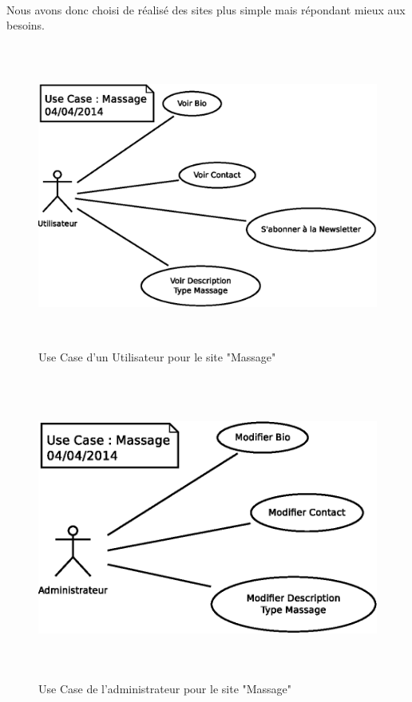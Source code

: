 \documentclass[11pt,a4paper]{report}
\begin{document}
				\paragraph*{}Nous avons donc choisi de réalisé des sites plus simple mais répondant mieux aux besoins.
				\begin{figure}[H]
					\centering
					\includegraphics[height=10cm]{UseCase-Massage-User.eps}
					\caption[Use Case Utilisateur Massage]{Use Case d'un Utilisateur pour le site "Massage"}
					\label{fig:UseCase-Massage_User}
				\end{figure}
				\begin{figure}[H]
					\centering
					\includegraphics[height=10cm]{UseCase-Massage-Administrateur.eps}
					\caption[Use Case Administrateur Massage]{Use Case de l'administrateur pour le site "Massage"}
					\label{fig:UseCase-Massage_Admin}
				\end{figure}
\end{document}
